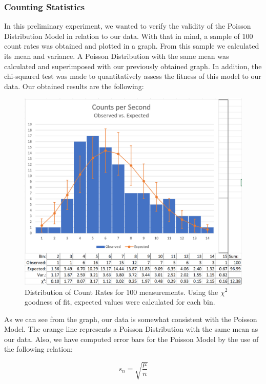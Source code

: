 \documentclass[a4paper]{article}
\begin{document}
\clearpage

\subsubsection{Counting Statistics}
In this preliminary experiment, we wanted to verify the validity of the Poisson Distribution Model in relation to our data. With that in mind, a sample of 100 count rates was obtained and plotted in a graph. From this sample we calculated its mean and variance. A Poisson Distribution with the same mean was calculated and superimposed with our previously obtained graph. In addition, the chi-squared test was made to quantitatively assess the fitness of this model to our data. Our obtained results are the following:

\begin{figure}[h]
  \includegraphics[scale=0.75]{countingstatistics2} 
  \centering
  \caption{Distribution of Count Rates for 100 measurements. Using the $\chi^{2}$ goodness of fit, expected values were calculated for each bin.}
  \end{figure}
  
  As we can see from the graph, our data is somewhat consistent with the Poisson Model. The orange line represents a Poisson Distribution with the same mean as our data. Also, we have computed error bars for the Poisson Model by the use of the following relation:
    
  \begin{equation}
  s_n = \sqrt{\frac{\mu}{n}}
  \end{equation}
  
\end{document}

